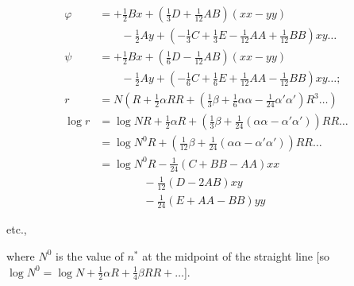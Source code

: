 \[
\begin{aligned}
\varphi&=+\tfrac12Bx+(\tfrac13D+\tfrac1{12}AB)(xx-yy)\\
&\qquad-\tfrac12Ay+(-\tfrac13C+\tfrac13E-\tfrac1{12}AA+\tfrac1{12}BB)xy\ldots\\
\psi&=+\tfrac12Bx+(\tfrac16D-\tfrac1{12}AB)(xx-yy)\\
&\qquad-\tfrac12Ay+(-\tfrac16C+\tfrac16E+\tfrac1{12}AA-\tfrac1{12}BB)xy\ldots;\\[5pt]
r&=N\left(R+\tfrac12\alpha RR+(\tfrac13\beta+\tfrac16\alpha\alpha-\tfrac1{24}\alpha'\alpha')R^3\ldots\right)\\
\log r&=\log NR+\tfrac12\alpha R+\left(\tfrac13\beta+\tfrac1{24}(\alpha\alpha-\alpha'\alpha')\right)RR\ldots\\
&=\log N^0R+\left(\tfrac1{12}\beta+\tfrac1{24}(\alpha\alpha-\alpha'\alpha')\right)RR\ldots\\
&=\log N^0R-\tfrac1{24}(C+BB-AA)xx\\
&\qquad\qquad-\tfrac1{12}(D-2AB)xy\\
&\qquad\qquad-\tfrac1{24}(E+AA-BB)yy
\end{aligned}
\]
\begin{center}etc.,\end{center}
where $N^0$ is the value of $n^*$ at the midpoint of the straight line [so $\log N^0=\log N+\tfrac12\alpha R+\tfrac14\beta RR+\ldots$].

